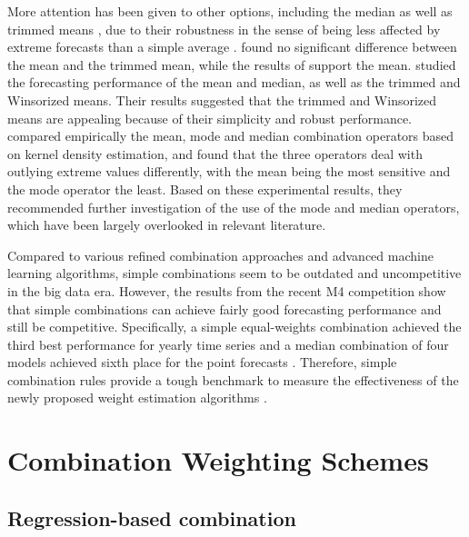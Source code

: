 \documentclass[11pt]{article}
\begin{document}
More attention has been given to other options, including the median as well as trimmed means \citep[e.g.,][]{Chan1999-io,Stock2004-rq,Genre2013-ut,Jose2014-uh,Grushka-Cockayne2017-dj}, due to their robustness in the sense of being less affected by extreme forecasts than a simple average \citep{Lichtendahl2020-ut}. \cite{McNees1992-qc} found no significant difference between the mean and the trimmed mean, while the results of \cite{Stock2004-rq} support the mean. \cite{Jose2008-vm} studied the forecasting performance of the mean and median, as well as the trimmed and Winsorized means. Their results suggested that the trimmed and Winsorized means are appealing because of their simplicity and robust performance. \cite{Kourentzes2014-hs} compared empirically the mean, mode and median combination operators based on kernel density estimation, and found that the three operators deal with outlying extreme values differently, with the mean being the most sensitive and the mode operator the least. Based on these experimental results, they recommended further investigation of the use of the mode and median operators, which have been largely overlooked in relevant literature.

Compared to various refined combination approaches and advanced machine learning algorithms, simple combinations seem to be outdated and uncompetitive in the big data era. However, the results from the recent M4 competition \citep{Makridakis2020-hu} show that simple combinations can achieve fairly good forecasting performance and still be competitive. Specifically, a simple equal-weights combination achieved the third best performance for yearly time series \citep{Shaub2019-on} and a median combination of four models achieved sixth place for the point forecasts \citep{Petropoulos2020-fp}. Therefore, simple combination rules provide a tough benchmark to measure the effectiveness of the newly proposed weight estimation algorithms \citep[e.g.,][]{Makridakis2000-he,Stock2004-rq,Makridakis2020-hu,Montero-Manso2020-tq,Kang2020-rl,Wang2021-un}.


\section{Combination Weighting Schemes}

\subsection{Regression-based combination}
\end{document}
